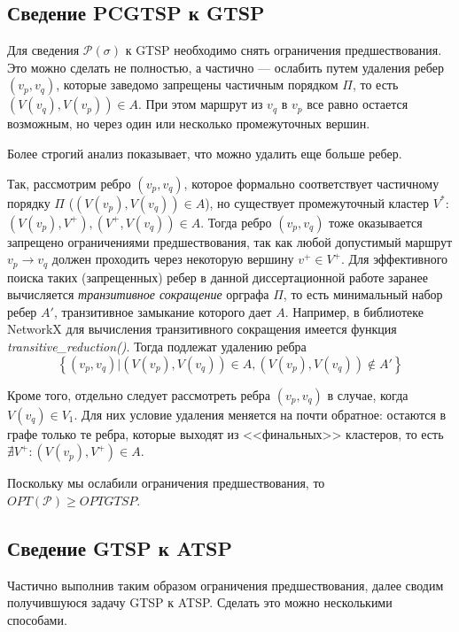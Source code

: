 \subsection*{Сведение PCGTSP к GTSP}

Для сведения
$\mathcal P(\sigma)$
к GTSP
необходимо снять ограничения предшествования.
Это можно сделать не полностью, а частично ---
ослабить
путем удаления ребер
$(v_p, v_q)$, которые заведомо запрещены
частичным порядком $\Pi$,
то есть
$(V(v_q), V(v_p))\in A$.
При этом маршрут из $v_q$ в $v_p$
все равно остается возможным,
но через один или несколько промежуточных вершин.

Более строгий анализ показывает,
что можно удалить еще больше ребер.

Так, рассмотрим ребро
$(v_p, v_q)$,
которое формально соответствует частичному порядку $\Pi$
($(V(v_p), V(v_q))\in A$),
но существует промежуточный кластер $V^*$:
$(V(v_p), V^+), (V^+, V(v_q))\in A$.
Тогда ребро
$(v_p, v_q)$
тоже оказывается запрещено ограничениями предшествования,
так как любой допустимый маршрут
$v_p \to v_q$
должен проходить через некоторую вершину
$v^+ \in V^+$.
Для эффективного поиска таких
(запрещенных)
ребер
в данной диссертационной работе
заранее вычисляется
\textit{транзитивное сокращение}
орграфа $\Pi$,
то есть минимальный набор ребер
$A'$,
транзитивное замыкание которого дает $A$.
Например, в библиотеке NetworkX \cite{bi:NetworkX}
для вычисления транзитивного сокращения
имеется функция \textit{transitive\_reduction()}.
Тогда подлежат удалению ребра
$$
\left\{(v_p, v_q)|
  (V(v_p), V(v_q))\in A, (V(v_p), V(v_q))\notin A'\right\}
$$

Кроме того, отдельно следует рассмотреть ребра
$(v_p, v_q)$
в случае, когда
$V(v_q)\in V_1$.
Для них условие удаления меняется на почти обратное:
остаются в графе только те ребра,
которые выходят из <<финальных>> кластеров,
то есть
$\nexists V^+ \colon (V(v_p), V^+)\in A$.

Поскольку мы ослабили ограничения предшествования,
то
$OPT(\mathcal P) \geqslant OPT{GTSP}$.

\subsection{Сведение GTSP к ATSP}
Частично выполнив таким образом ограничения предшествования,
далее сводим получившуюся задачу GTSP
к ATSP. Сделать это можно несколькими способами.

